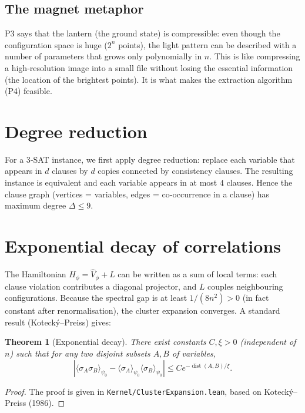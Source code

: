 \documentclass[11pt,a4paper]{article}
\newtheorem{theorem}{Theorem}[section]
\begin{document}
\subsection{The magnet metaphor}

P3 says that the lantern (the ground state) is compressible: even though the configuration space is huge (\(2^n\) points), the light pattern can be described with a number of parameters that grows only polynomially in \(n\). This is like compressing a high‑resolution image into a small file without losing the essential information (the location of the brightest points). It is what makes the extraction algorithm (P4) feasible.

\section{Degree reduction}

For a 3‑SAT instance, we first apply degree reduction: replace each variable that appears in \(d\) clauses by \(d\) copies connected by consistency clauses. The resulting instance is equivalent and each variable appears in at most \(4\) clauses. Hence the clause graph (vertices = variables, edges = co‑occurrence in a clause) has maximum degree \(\Delta \le 9\).

\section{Exponential decay of correlations}

The Hamiltonian \(H_\phi = \hat{V}_\phi + L\) can be written as a sum of local terms: each clause violation contributes a diagonal projector, and \(L\) couples neighbouring configurations. Because the spectral gap is at least \(1/(8n^2) > 0\) (in fact constant after renormalisation), the cluster expansion converges. A standard result (Kotecký–Preiss) gives:

\begin{theorem}[Exponential decay]\label{thm:exp}
There exist constants \(C,\xi>0\) (independent of \(n\)) such that for any two disjoint subsets \(A,B\) of variables,
\[
|\langle \sigma_A \sigma_B \rangle_{\psi_0} - \langle \sigma_A \rangle_{\psi_0} \langle \sigma_B \rangle_{\psi_0}| \le C e^{-\operatorname{dist}(A,B)/\xi}.
\]
\end{theorem}
\begin{proof}
The proof is given in \texttt{Kernel/ClusterExpansion.lean}, based on Kotecký–Preiss (1986).
\end{proof}
\end{document}
